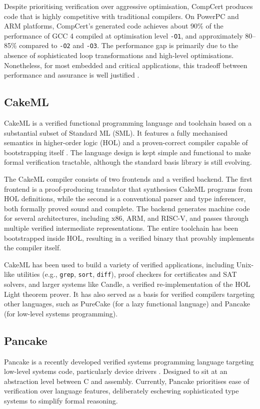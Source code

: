 Despite prioritising verification over aggressive optimisation, CompCert produces code that is highly competitive with traditional compilers. On PowerPC and ARM platforms, CompCert’s generated code achieves about 90\% of the performance of GCC 4 compiled at optimisation level \texttt{-O1}, and approximately 80--85\% compared to \texttt{-O2} and \texttt{-O3}. The performance gap is primarily due to the absence of sophisticated loop transformations and high-level optimisations. Nonetheless, for most embedded and critical applications, this tradeoff between performance and assurance is well justified \citep{leroy2009compcert}.

\subsection{CakeML}
CakeML is a verified functional programming language and toolchain based on a substantial subset of Standard ML (SML). It features a fully mechanised semantics in higher-order logic (HOL) and a proven-correct compiler capable of bootstrapping itself \citep{kumar2014cakeml}. The language design is kept simple and functional to make formal verification tractable, although the standard basis library is still evolving.

The CakeML compiler consists of two frontends and a verified backend. The first frontend is a proof-producing translator that synthesises CakeML programs from HOL definitions, while the second is a conventional parser and type inferencer, both formally proved sound and complete. The backend generates machine code for several architectures, including x86, ARM, and RISC-V, and passes through multiple verified intermediate representations. The entire toolchain has been bootstrapped inside HOL, resulting in a verified binary that provably implements the compiler itself.

CakeML has been used to build a variety of verified applications, including Unix-like utilities (e.g., \texttt{grep}, \texttt{sort}, \texttt{diff}), proof checkers for certificates and SAT solvers, and larger systems like Candle, a verified re-implementation of the HOL Light theorem prover. It has also served as a basis for verified compilers targeting other languages, such as PureCake (for a lazy functional language) and Pancake (for low-level systems programming). 


\subsection{Pancake}
Pancake is a recently developed verified systems programming language targeting low-level systems code, particularly device drivers \citep{Pohjola2023pancake}. Designed to sit at an abstraction level between C and assembly. Currently, Pancake prioritises ease of verification over language features, deliberately eschewing sophisticated type systems to simplify formal reasoning.

